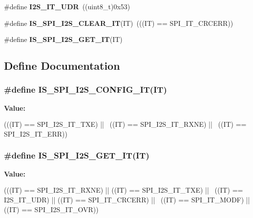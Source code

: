 \begin{DoxyCompactItemize}
\item 
\hypertarget{group__SPI__I2S__interrupts__definition_ga54aba7dc06f97fb4839de5f42bd5a47d}{
\#define {\bfseries I2S\_\-IT\_\-UDR}~((uint8\_\-t)0x53)}
\label{group__SPI__I2S__interrupts__definition_ga54aba7dc06f97fb4839de5f42bd5a47d}

\item 
\hypertarget{group__SPI__I2S__interrupts__definition_gabeb917a0a708af0439f753a5f4af4c5e}{
\#define {\bfseries IS\_\-SPI\_\-I2S\_\-CLEAR\_\-IT}(IT)~(((IT) == SPI\_\-IT\_\-CRCERR))}
\label{group__SPI__I2S__interrupts__definition_gabeb917a0a708af0439f753a5f4af4c5e}

\item 
\#define {\bfseries IS\_\-SPI\_\-I2S\_\-GET\_\-IT}(IT)
\end{DoxyCompactItemize}


\subsection{Define Documentation}
\hypertarget{group__SPI__I2S__interrupts__definition_ga3ec2f6950d7ff801f992e65593c3365e}{
\subsubsection[{IS\_\-SPI\_\-I2S\_\-CONFIG\_\-IT}]{\setlength{\rightskip}{0pt plus 5cm}\#define IS\_\-SPI\_\-I2S\_\-CONFIG\_\-IT(IT)}}
\label{group__SPI__I2S__interrupts__definition_ga3ec2f6950d7ff801f992e65593c3365e}
{\bfseries Value:}
\begin{DoxyCode}
(((IT) == SPI_I2S_IT_TXE) || \
                                 ((IT) == SPI_I2S_IT_RXNE) || \
                                 ((IT) == SPI_I2S_IT_ERR))
\end{DoxyCode}
\hypertarget{group__SPI__I2S__interrupts__definition_gacb2949c066a74f1c4ef8c6a0d4e14a0c}{
\subsubsection[{IS\_\-SPI\_\-I2S\_\-GET\_\-IT}]{\setlength{\rightskip}{0pt plus 5cm}\#define IS\_\-SPI\_\-I2S\_\-GET\_\-IT(IT)}}
\label{group__SPI__I2S__interrupts__definition_gacb2949c066a74f1c4ef8c6a0d4e14a0c}
{\bfseries Value:}
\begin{DoxyCode}
(((IT) == SPI_I2S_IT_RXNE) || ((IT) == SPI_I2S_IT_TXE) || \
                               ((IT) == I2S_IT_UDR) || ((IT) == SPI_IT_CRCERR) ||
       \
                               ((IT) == SPI_IT_MODF) || ((IT) == SPI_I2S_IT_OVR))
      
\end{DoxyCode}
